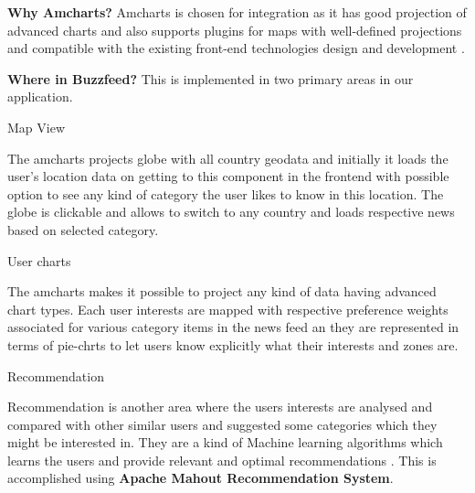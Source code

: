 \begin{enumerate}
    \textbf{Why Amcharts?}\newline
    Amcharts is chosen for integration as it has good projection of advanced charts and also supports plugins for maps with well-defined projections and compatible with the existing front-end technologies design and development \cite{amcharts_2018}.
    
    \textbf{Where in Buzzfeed?} \newline
    This is implemented in two primary areas in our application.
    
\begin{itemize}
    {\bf \item Map View}
    The amcharts projects globe with all country geodata and initially it loads the user's location data on getting to this component in the frontend with possible option to see any kind of category the user likes to know in this location.
    The globe is clickable and allows to switch to any country and loads respective news based on selected category.
    
   { \bf \item User charts }
   The amcharts makes it possible to project any kind of data having advanced chart types. Each user interests are mapped with respective preference weights associated for various category items in the news feed an they are represented in terms of pie-chrts to let users know explicitly what their interests and zones are. 
   
\end{itemize}

    {\bf \large \item   Recommendation }\newline
    Recommendation is another area where the users interests are analysed and compared with other similar users and suggested some categories which they might be interested in. They are a kind of Machine learning algorithms which learns the users and provide relevant and optimal recommendations \cite{mishra}. This is accomplished using \textbf{Apache Mahout Recommendation System}.
    

\end{enumerate}

